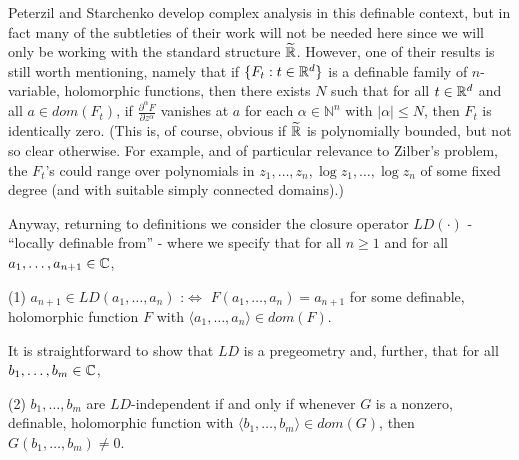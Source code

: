 \documentclass[12pt,nodate]{article}
\begin{document}
Peterzil and Starchenko develop complex analysis in this definable context, but in fact many of the subtleties of their work will not be needed here since we will only be working with the standard structure $\widetilde{\mathbb{R}}$. However, one of their results is still worth mentioning, namely that if $\{F_t:t\in \mathbb{R}^d \}$ is a definable family of $n$-variable, holomorphic functions, then there exists $N$ such that for all $t \in \mathbb{R}^d$ and all $a \in dom(F_t )$, if $\frac{\partial^{\alpha}F}{\partial z^{\alpha}}$ vanishes at $a$ for each $\alpha \in \mathbb{N}^n$ with $|\alpha | \leq N$, then $F_t$ is identically zero. (This is, of course, obvious if $\widetilde{\mathbb{R}}$ is polynomially bounded, but not so clear otherwise. For example, and of particular relevance to Zilber's problem, the $F_t$'s could range over polynomials in
$z_1, \ldots, z_n, \log z_1,\ldots,\log z_n$ of some fixed degree (and with suitable simply connected domains).)

\vspace{3mm}

Anyway, returning to definitions we consider the closure operator $LD(\cdot)$ - ``locally definable from'' - where we specify that for all $n \geq 1$ and for all  $a_1, \ldots, a_{n+1} \in \mathbb{C}$,

\vspace{2mm}


\noindent 
(1) \hspace{2mm} $a_{n+1} \in LD(a_1, \ldots, a_n )$ \hspace{1mm} :$\Longleftrightarrow$
\hspace{1mm} $F(a_1, \ldots, a_n ) 
= a_{n+1}$ \hspace{2mm}for some definable, holomorphic function $F$ with $\langle a_1, \ldots, a_n \rangle \in dom(F)$.

\vspace{2mm}

It is straightforward to show that $LD$ is a pregeometry and, further, that for all $b_1, \ldots, b_m \in \mathbb{C}$,

\vspace{2mm}

\noindent
(2)\hspace{2mm} $b_1, \ldots, b_m$ are $LD$-independent if and only if whenever $G$ is a nonzero, definable, holomorphic function with $\langle b_1, \ldots, b_m \rangle \in dom(G)$, then $G(b_1, \ldots, b_m) \neq 0$.

\vspace{2mm}
\end{document}
